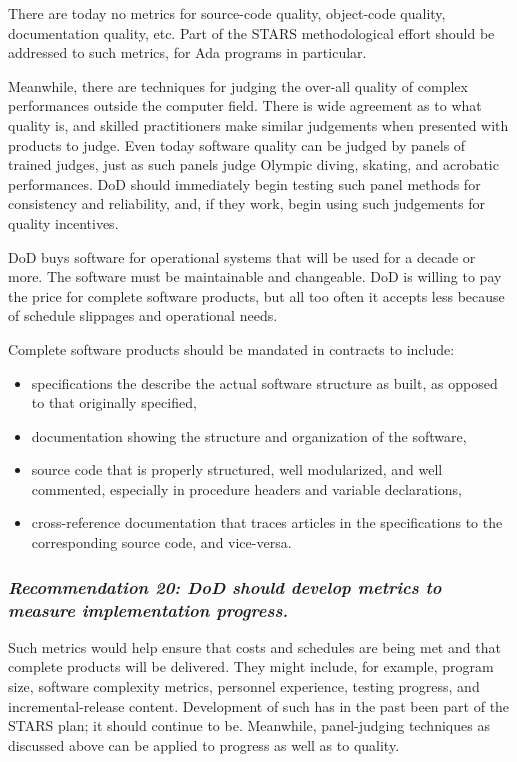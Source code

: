 \documentclass[11pt,final]{article}
\begin{document}
There are today no metrics for source-code quality, object-code quality,
documentation quality, etc. Part of the STARS methodological effort should be
addressed to such metrics, for Ada programs in particular.

Meanwhile, there are techniques for judging the over-all quality of complex
performances outside the computer field. There is wide agreement as to what
quality is, and skilled practitioners make similar judgements when presented
with products to judge. Even today software quality can be judged by panels of
trained judges, just as such panels judge Olympic diving, skating, and
acrobatic performances. DoD should immediately begin testing such panel methods
for consistency and reliability, and, if they work, begin using such judgements
for quality incentives.

DoD buys software for operational systems that will be used for a decade or
more. The software must be maintainable and changeable. DoD is willing to pay
the price for complete software products, but all too often it accepts less
because of schedule slippages and operational needs.

Complete software products should be mandated in contracts to include:

\begin{itemize}
    \item specifications the describe the actual software structure as built,
        as opposed to that originally specified,
    \item documentation showing the structure and organization of the software,
    \item source code that is properly structured, well modularized, and well
        commented, especially in procedure headers and variable declarations,
    \item cross-reference documentation that traces articles in the
        specifications to the corresponding source code, and vice-versa.
\end{itemize}

\label{rec:20}
\subsubsection*{\textit{Recommendation 20: DoD should develop metrics to
measure implementation progress.}}

Such metrics would help ensure that costs and schedules are being met and that
complete products will be delivered. They might include, for example, program
size, software complexity metrics, personnel experience, testing progress, and
incremental-release content. Development of such has in the past been part of
the STARS plan; it should continue to be. Meanwhile, panel-judging techniques
as discussed above can be applied to progress as well as to quality.
\end{document}
